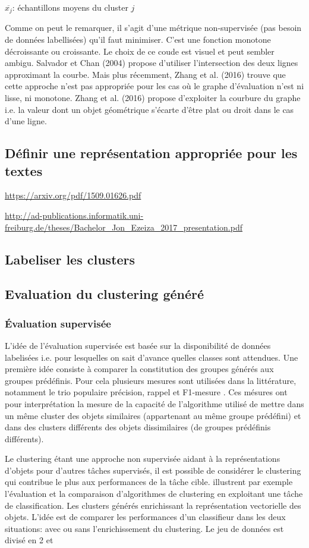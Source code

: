 $\overline{x_j}$: échantillons moyens du cluster $j$

Comme on peut le remarquer, il s’agit d’une métrique non-supervisée (pas besoin de données labellisées) qu’il faut minimiser. C’est une fonction monotone décroissante ou croissante. Le choix de ce coude est visuel et peut sembler ambigu. Salvador et Chan (2004) propose d’utiliser l’intersection des deux lignes approximant la courbe. Mais plus récemment, Zhang et al. (2016) trouve que cette approche n’est pas appropriée pour les cas où le graphe d’évaluation n’est ni lisse, ni monotone. Zhang et al. (2016) propose d’exploiter la courbure du graphe i.e. la valeur dont un objet géométrique s'écarte d'être plat ou droit dans le cas d'une ligne.

\subsection{Définir une représentation appropriée pour les textes}
\url{https://arxiv.org/pdf/1509.01626.pdf}

\url{http://ad-publications.informatik.uni-freiburg.de/theses/Bachelor_Jon_Ezeiza_2017_presentation.pdf}


\subsection{Labeliser les clusters}

\subsection{Evaluation du clustering généré}
\subsubsection{Évaluation supervisée}
L'idée de l'évaluation supervisée est basée sur la disponibilité de données labelisées i.e. pour lesquelles on sait d'avance quelles classes sont attendues. Une première idée consiste à comparer la constitution des groupes générés aux groupes prédéfinis. Pour cela plusieurs mesures sont utilisées dans la littérature, notamment le trio populaire précision, rappel et F1-mesure . Ces mésures ont pour interprétation la mesure de la capacité de l'algorithme utilisé de mettre dans un même cluster des objets similaires (appartenant au même groupe prédéfini) et dans des clusters différents des objets dissimilaires (de groupes prédéfinis différents). 
  
  Le clustering étant une approche non supervisée aidant à la représentations d'objets pour d'autres tâches supervisés, il est possible de considérer le clustering qui contribue le plus aux performances de la tâche cible. \citet{candillier2006clustEvalCascad} illustrent par exemple l'évaluation et la comparaison d'algorithmes de clustering en exploitant une tâche de classification. Les clusters générés enrichissant la représentation vectorielle des objets. L'idée est de comparer les performances d'un classifieur dans les deux situations: avec ou sans l'enrichissement du clustering. Le jeu de données est divisé en 2 et 


